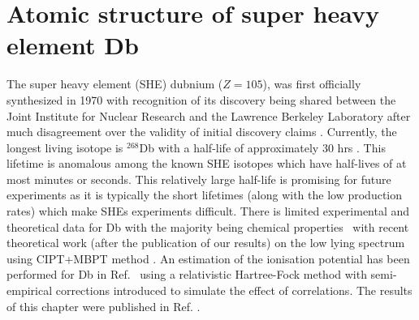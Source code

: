 \documentclass[10pt,a4paper, twoside, openright]{report}
\begin{document}
\chapter{Atomic structure of super heavy element Db } \label{chap:Db}
The super heavy element (SHE) dubnium ($Z=105$), was first officially synthesized in 1970 with recognition of its discovery being shared between the Joint Institute for Nuclear Research and the Lawrence Berkeley Laboratory after much disagreement over the validity of initial discovery claims \cite{Barber1992}.  Currently, the longest living isotope is $^{268}$Db with a half-life of approximately $ 30 $ hrs \cite{Schadel2012, Oganessian2005}. This lifetime  is anomalous among the known SHE isotopes which have half-lives of at most minutes or seconds. This relatively large half-life is promising for future experiments as it is typically the short lifetimes (along with the low production rates) which make SHEs experiments difficult. There is limited experimental and theoretical data for Db with the majority being chemical properties~\cite{Schadel2012, Fricke1975} with recent theoretical work (after the publication of our results) on the low lying spectrum using CIPT+MBPT method \cite{Geddes2018}.  An estimation of the ionisation potential has been performed for Db in Ref.~\cite{Dzuba2016} using a relativistic 
 Hartree-Fock  method with semi-empirical corrections introduced to simulate the effect of correlations. The results of this chapter were published in Ref. \cite{LDFDb2018}.
\end{document}

